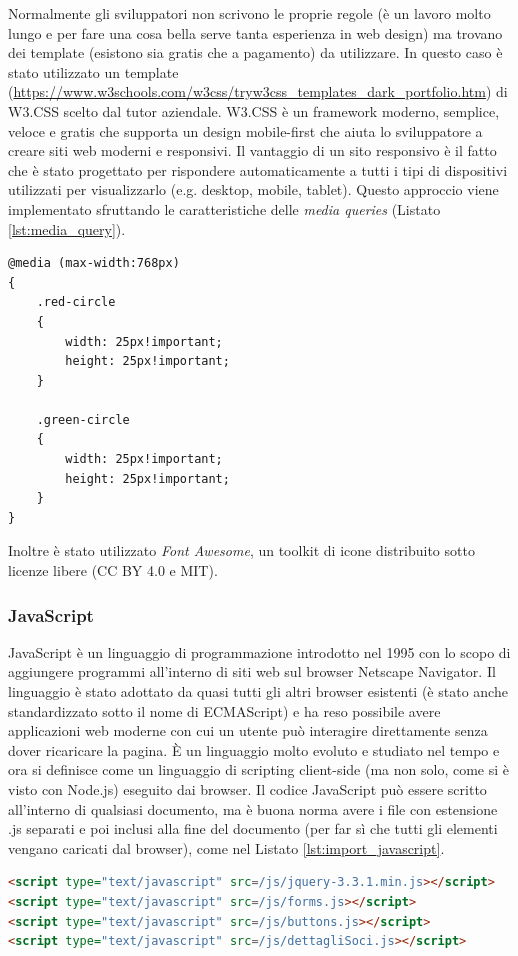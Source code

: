 \documentclass[12pt]{report}
\begin{document}
Normalmente gli sviluppatori non scrivono le proprie regole (è un lavoro molto lungo e per fare una cosa bella serve tanta esperienza in web design) ma trovano dei template (esistono sia gratis che a pagamento) da utilizzare. In questo caso è stato utilizzato un template (\url{https://www.w3schools.com/w3css/tryw3css_templates_dark_portfolio.htm}) di W3.CSS scelto dal tutor aziendale. W3.CSS è un framework moderno, semplice, veloce e gratis che supporta un design mobile-first che aiuta lo sviluppatore a creare siti web moderni e responsivi. Il vantaggio di un sito responsivo è il fatto che è stato progettato per rispondere automaticamente a tutti i tipi di dispositivi utilizzati per visualizzarlo (e.g. desktop, mobile, tablet). Questo approccio viene implementato sfruttando le caratteristiche delle \emph{media queries} (Listato \ref{lst:media_query}).
\begin{lstlisting}[morekeywords={ @media, max-width, px, width, height, !important}, caption={Esempio di \emph{media query}}, label={lst:media_query}]
@media (max-width:768px)
{
	.red-circle
	{
		width: 25px!important;
		height: 25px!important;
	}
	
	.green-circle
	{
		width: 25px!important;
		height: 25px!important;
	}
}
\end{lstlisting}
Inoltre è stato utilizzato \emph{Font Awesome}, un toolkit di icone distribuito sotto licenze libere (CC BY 4.0 e MIT).
%
\subsubsection*{JavaScript}
%
JavaScript è un linguaggio di programmazione introdotto nel 1995 con lo scopo di aggiungere programmi all'interno di siti web sul browser Netscape Navigator. Il linguaggio è stato adottato da quasi tutti gli altri browser esistenti (è stato anche standardizzato sotto il nome di ECMAScript) e ha reso possibile avere applicazioni web moderne con cui un utente può interagire direttamente senza dover ricaricare la pagina\cite{eloquent_javascript}. È un linguaggio molto evoluto e studiato nel tempo e ora si definisce come un linguaggio di scripting client-side (ma non solo, come si è visto con Node.js) eseguito dai browser. Il codice JavaScript può essere scritto all'interno di qualsiasi documento, ma è buona norma avere i file con estensione .js separati e poi inclusi alla fine del documento (per far sì che tutti gli elementi vengano caricati dal browser), come nel Listato \ref{lst:import_javascript}.
\begin{lstlisting}[language=HTML, caption={Importazione dei file .js nel documento HTML}, label={lst:import_javascript}]
<script type="text/javascript" src=/js/jquery-3.3.1.min.js></script>
<script type="text/javascript" src=/js/forms.js></script>
<script type="text/javascript" src=/js/buttons.js></script>
<script type="text/javascript" src=/js/dettagliSoci.js></script>
\end{lstlisting}
\end{document}
